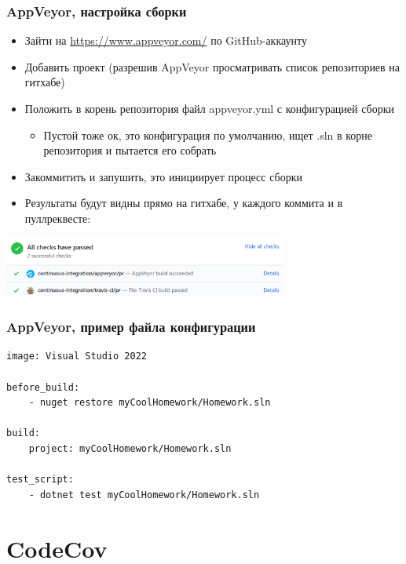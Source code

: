 \documentclass{../../slides-style}
\begin{document}
    \begin{frame}
        \frametitle{AppVeyor, настройка сборки}
        \begin{itemize}
            \item Зайти на \url{https://www.appveyor.com/} по GitHub-аккаунту
            \item Добавить проект (разрешив AppVeyor просматривать список репозиториев на гитхабе)
            \item Положить в корень репозитория файл appveyor.yml с конфигурацией сборки
            \begin{itemize}
                \item Пустой тоже ок, это конфигурация по умолчанию, ищет .sln в корне репозитория и пытается его собрать
            \end{itemize}
            \item Закоммитить и запушить, это инициирует процесс сборки
            \item Результаты будут видны прямо на гитхабе, у каждого коммита и в пуллреквесте:
        \end{itemize}
        \begin{center}
            \includegraphics[width=0.7\textwidth]{appVeyorSuccess.png}
        \end{center}
    \end{frame}

    \begin{frame}[fragile]
        \frametitle{AppVeyor, пример файла конфигурации}
        \begin{verbatim}
image: Visual Studio 2022

before_build: 
    - nuget restore myCoolHomework/Homework.sln

build: 
    project: myCoolHomework/Homework.sln

test_script: 
    - dotnet test myCoolHomework/Homework.sln
        \end{verbatim}
    \end{frame}

    \section{CodeCov}
\end{document}
